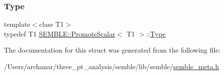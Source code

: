 \subsubsection{\texorpdfstring{Type}{Type}\hspace{0.1cm}{\footnotesize\ttfamily [2/2]}}
{\footnotesize\ttfamily template$<$class T1$>$ \\
typedef T1 \mbox{\hyperlink{structSEMBLE_1_1PromoteScalar}{S\+E\+M\+B\+L\+E\+::\+Promote\+Scalar}}$<$ T1 $>$\+::\mbox{\hyperlink{structSEMBLE_1_1PromoteScalar_a3d460c95c065a6844726ec8397ba3c23}{Type}}}



The documentation for this struct was generated from the following file\+:\begin{DoxyCompactItemize}
\item 
/\+Users/archanar/three\+\_\+pt\+\_\+analysis/semble/lib/semble/\mbox{\hyperlink{lib_2semble_2semble__meta_8h}{semble\+\_\+meta.\+h}}\end{DoxyCompactItemize}
